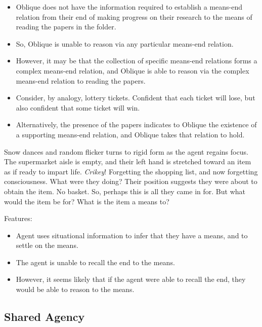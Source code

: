 \documentclass[10pt]{article}
\begin{document}
\begin{itemize}[noitemsep]
\item Oblique does not have the information required to establish a means-end relation from their end of making progress on their research to the means of reading the papers in the folder.
\item So, Oblique is unable to reason via any particular means-end relation.
\item However, it may be that the collection of specific means-end relations forms a complex means-end relation, and Oblique is able to reason via the complex means-end relation to reading the papers.
\item Consider, by analogy, lottery tickets.
  Confident that each ticket will lose, but also confident that some ticket will win.
\item Alternatively, the presence of the papers indicates to Oblique the existence of a supporting means-end relation, and Oblique takes that relation to hold.
\end{itemize}


\begin{scenario}
  Snow dances and random flicker turns to rigid form as the agent regains focus.
  The supermarket aisle is empty, and their left hand is stretched toward an item as if ready to impart life.
  \emph{Crikey}!
  Forgetting the shopping list, and now forgetting consciousness.
  What were they doing?
  Their position suggests they were about to obtain the item.
  No basket. So, perhaps this is all they came in for.
  But what would the item be for? What is the item a means to?
\end{scenario}

Features:
\begin{itemize}[noitemsep]
\item Agent uses situational information to infer that they have a means, and to settle on the means.
\item The agent is unable to recall the end to the means.
\item However, it seems likely that if the agent were able to recall the end, they would be able to reason to the means.
\end{itemize}



\subsection{Shared Agency}
\label{sec:shared-agency}
\end{document}
